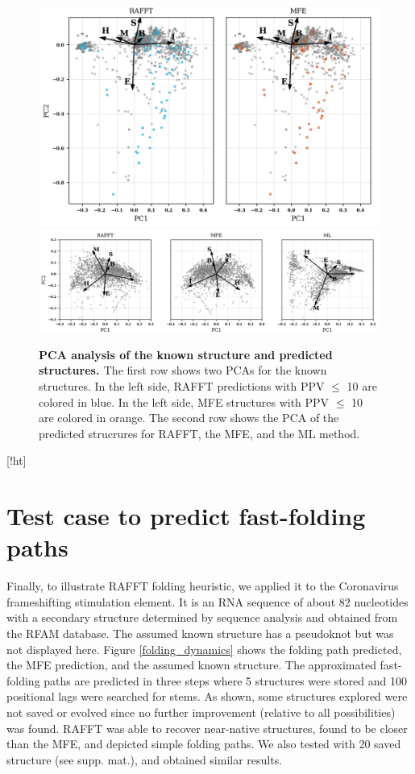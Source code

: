 \documentclass[a4paper,12pt]{article}
\begin{document}
{{\begin{figure}[!ht]
  \centering
  \includegraphics[scale=0.5]{img/pca_known.png}\\
  \includegraphics[scale=0.7]{img/pca_predicted.png} 
  \caption{\textbf{PCA analysis of the known structure and predicted
      structures. \label{pca_struct}} The first row shows two PCAs for the known
    structures. In the left side, RAFFT predictions with PPV $\leq$ 10 are
    colored in blue. In the left side, MFE structures with PPV $\leq$ 10 are
    colored in orange. The second row shows the PCA of the predicted strucrures
    for RAFFT, the MFE, and the ML method.}
\end{figure}[!ht]

\clearpage
\section{Test case to predict fast-folding paths}
\label{sec:org3e617cc}
Finally, to illustrate RAFFT folding heuristic, we applied it to the Coronavirus
frameshifting stimulation element. It is an RNA sequence of about 82 nucleotides
with a secondary structure determined by sequence analysis and obtained from the
RFAM database. The assumed known structure has a pseudoknot but was not
displayed here. Figure \ref{folding_dynamics} shows the folding path predicted,
the MFE prediction, and the assumed known structure. The approximated
fast-folding paths are predicted in three steps where 5 structures were stored
and 100 positional lags were searched for stems. As shown, some structures
explored were not saved or evolved since no further improvement (relative to all
possibilities) was found. RAFFT was able to recover near-native structures,
found to be closer than the MFE, and depicted simple folding paths. We also
tested with 20 saved structure (see supp. mat.), and obtained similar results.

}}
\end{document}
